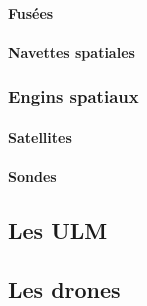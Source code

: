 		\paragraph{Fusées}
		\paragraph{Navettes spatiales}
		
	\subsubsection{Engins spatiaux}
		\paragraph{Satellites}
		\paragraph{Sondes}
		
\subsection{Les ULM}

\subsection{Les drones}